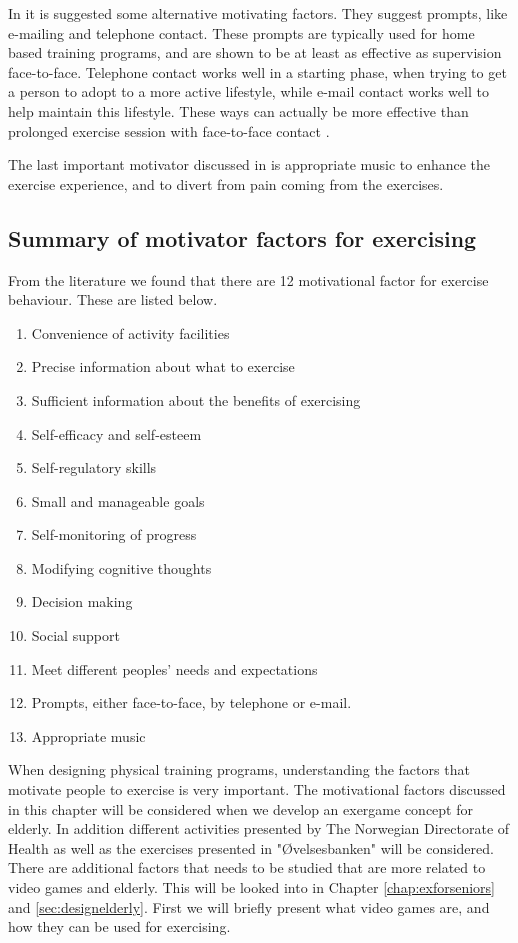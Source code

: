 In \cite{schutzer} it is suggested some alternative motivating factors. They suggest prompts, like e-mailing and telephone contact. These prompts are typically used for home based training programs, and are shown to be at least as effective as supervision face-to-face. Telephone contact works well in a starting phase, when trying to get a person to adopt to a more active lifestyle, while e-mail contact works well to help maintain this lifestyle. These ways can actually be more effective than prolonged exercise session with face-to-face contact \cite{schutzer}. 

The last important motivator discussed in \cite{schutzer} is appropriate music to enhance the exercise experience, and to divert from pain coming from the exercises. 


\subsection{Summary of motivator factors for exercising}
\label{subsec:motivator}

From the literature we found that there are 12 motivational factor for exercise behaviour. These are listed below. 

\begin{enumerate}[{m}.1]
\item Convenience of activity facilities
\item Precise information about what to exercise 
\item Sufficient information about the benefits of exercising
\item Self-efficacy and self-esteem
\item Self-regulatory skills
\item Small and manageable goals
\item Self-monitoring of progress
\item Modifying cognitive thoughts 
\item Decision making
\item Social support
\item Meet different peoples' needs and expectations
\item Prompts, either face-to-face, by telephone or e-mail. 
\item Appropriate music
\end{enumerate} 

\bigskip


When designing physical training programs, understanding the factors that motivate people to exercise is very important. The motivational factors discussed in this chapter will be considered when we develop an exergame concept for elderly. In addition different activities presented by The Norwegian Directorate of Health as well as the exercises presented in "Øvelsesbanken" will be considered. There are additional factors that needs to be studied that are more related to video games and elderly. This will be looked into in Chapter \ref{chap:exforseniors} and \ref{sec:designelderly}. First we will briefly present what video games are, and how they can be used for exercising. 




